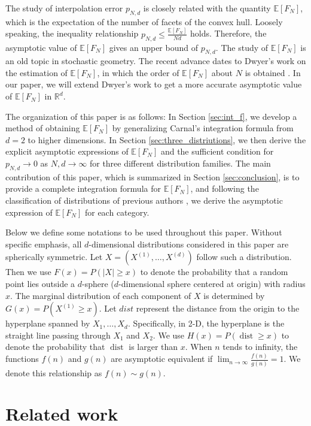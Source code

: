 \documentclass[conference,a4paper]{IEEEtran}
\DeclareMathOperator{\dist}{dist}
\def\E{\mathbb{E}}
\def\R{\mathbb{R}}
\begin{document}
The study of interpolation error $p_{N,d}$ is closely related with the quantity $\E[F_N]$,
which is the expectation of the number of facets of the convex hull. Loosely speaking,
the inequality relationship $p_{N,d} \leq \frac{\E[F_N]}{Nd}$ holds. Therefore, the asymptotic
value of $\E[F_N]$ gives an upper bound of $p_{N,d}$.
The study of $\E[F_N]$
is an old topic in stochastic geometry. The recent advance dates to Dwyer's work on the estimation of $\E[F_N]$,
in which the order of $\E[F_N]$ about $N$ is obtained \cite{dwyer1991convex}. In our paper, we will extend Dwyer's work
to get a more accurate asymptotic value of $\E[F_N]$ in $\R^d$.

The organization of this paper is as follows: In Section \ref{sec:int_f}, we develop a method of obtaining $\E[F_N]$ by generalizing Carnal's integration formula
from $d=2$ to higher dimensions.
In Section \ref{sec:three_distriutions}, we then derive the explicit asymptotic
expressions of $\E[F_N]$ and the sufficient condition for $p_{N,d}\to 0$ as $N,d \to \infty$
for three different distribution families.
The main contribution of this paper, which is summarized in Section \ref{sec:conclusion},
is to provide a complete integration formula for $\E[F_N]$,
and following the classification of distributions of previous authors \cite{carnal1970konvexe,dwyer1991convex},
we derive the asymptotic expression
of $\E[F_N]$ for each category.

Below we define some notations to be used throughout this paper.
Without specific emphasis, all $d$-dimensional distributions considered in this paper are spherically symmetric.
Let $X=(X^{(1)},\dots, X^{(d)})$ follow such a distribution.
Then we use $F(x)=P(|X|\geq x)$ to denote the probability that a random point lies outside
a $d$-sphere ($d$-dimensional sphere centered at origin) with radius $x$.
The marginal distribution of each component of $X$ is determined by $G(x)=P(X^{(1)}\geq x)$.
Let $dist$ represent the distance from the origin to the hyperplane spanned by $X_1, \dots, X_d$.
Specifically, in 2-D, the hyperplane is the straight line passing through $X_1$ and $X_2$.
We use $H(x)=P(\dist\geq x)$ to denote the probability that $\dist$ is larger than $x$.
When $n$ tends to infinity, the functions $f(n)$ and $g(n)$ are asymptotic equivalent if $\lim_{n\to \infty} \frac{f(n)}{g(n)}=1$.
We denote this relationship as $f(n) \sim g(n)$.
\section{Related work}
\end{document}
